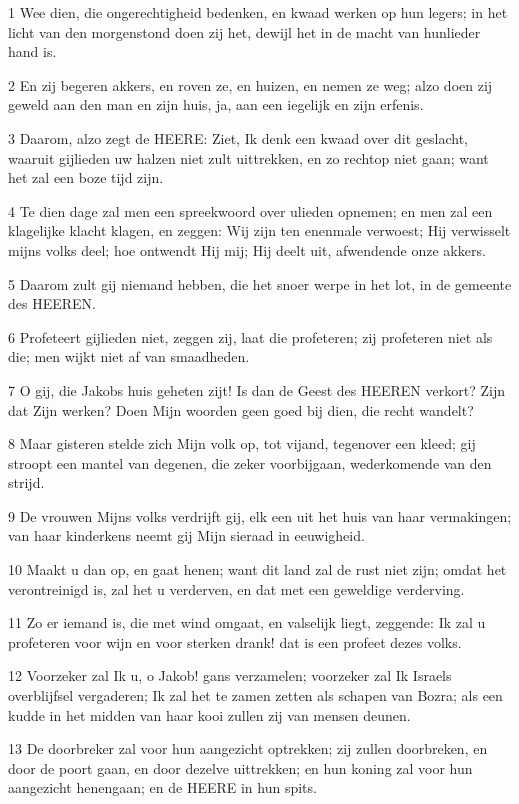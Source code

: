 \par 1 Wee dien, die ongerechtigheid bedenken, en kwaad werken op hun legers; in het licht van den morgenstond doen zij het, dewijl het in de macht van hunlieder hand is.
\par 2 En zij begeren akkers, en roven ze, en huizen, en nemen ze weg; alzo doen zij geweld aan den man en zijn huis, ja, aan een iegelijk en zijn erfenis.
\par 3 Daarom, alzo zegt de HEERE: Ziet, Ik denk een kwaad over dit geslacht, waaruit gijlieden uw halzen niet zult uittrekken, en zo rechtop niet gaan; want het zal een boze tijd zijn.
\par 4 Te dien dage zal men een spreekwoord over ulieden opnemen; en men zal een klagelijke klacht klagen, en zeggen: Wij zijn ten enenmale verwoest; Hij verwisselt mijns volks deel; hoe ontwendt Hij mij; Hij deelt uit, afwendende onze akkers.
\par 5 Daarom zult gij niemand hebben, die het snoer werpe in het lot, in de gemeente des HEEREN.
\par 6 Profeteert gijlieden niet, zeggen zij, laat die profeteren; zij profeteren niet als die; men wijkt niet af van smaadheden.
\par 7 O gij, die Jakobs huis geheten zijt! Is dan de Geest des HEEREN verkort? Zijn dat Zijn werken? Doen Mijn woorden geen goed bij dien, die recht wandelt?
\par 8 Maar gisteren stelde zich Mijn volk op, tot vijand, tegenover een kleed; gij stroopt een mantel van degenen, die zeker voorbijgaan, wederkomende van den strijd.
\par 9 De vrouwen Mijns volks verdrijft gij, elk een uit het huis van haar vermakingen; van haar kinderkens neemt gij Mijn sieraad in eeuwigheid.
\par 10 Maakt u dan op, en gaat henen; want dit land zal de rust niet zijn; omdat het verontreinigd is, zal het u verderven, en dat met een geweldige verderving.
\par 11 Zo er iemand is, die met wind omgaat, en valselijk liegt, zeggende: Ik zal u profeteren voor wijn en voor sterken drank! dat is een profeet dezes volks.
\par 12 Voorzeker zal Ik u, o Jakob! gans verzamelen; voorzeker zal Ik Israels overblijfsel vergaderen; Ik zal het te zamen zetten als schapen van Bozra; als een kudde in het midden van haar kooi zullen zij van mensen deunen.
\par 13 De doorbreker zal voor hun aangezicht optrekken; zij zullen doorbreken, en door de poort gaan, en door dezelve uittrekken; en hun koning zal voor hun aangezicht henengaan; en de HEERE in hun spits.

